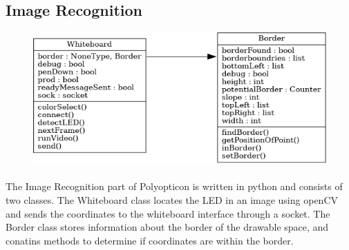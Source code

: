 \documentclass[12pt]{article}
\begin{document}
\subsection{Image Recognition}
\begin{figure}[H]
\centering
\includegraphics[scale=.5]{classdiagram.png}
\end{figure}
\paragraph{}
The Image Recognition part of Polyopticon is written in python and consists of two classes.
The Whiteboard class locates the LED in an image using openCV and sends the coordinates to the whiteboard interface through a socket.
The Border class stores information about the border of the drawable space, and conatins methods to determine if coordinates are within the border.


\end{document}
